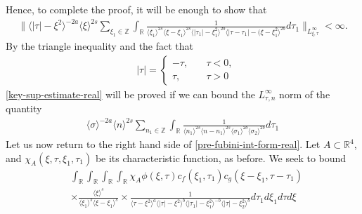 \documentclass[12pt,reqno]{amsart}
\numberwithin{equation}{section}  %
\numberwithin{figure}{section}
\newcommand{\rr}{\mathbb{R}}
\newcommand{\zz}{\mathbb{Z}}
\theoremstyle{plain}
\theoremstyle{definition}
\theoremstyle{remark}
\begin{document}
%
%
Hence, to complete the proof, it will be enough
to show that 
%
%
%
%
\begin{equation}
  \label{key-sup-estimate-real-1}
	\begin{split}
		 \| \langle | \tau | - \xi^{2} \rangle ^{-2a} \langle \xi
    \rangle ^{2s}
\sum_{\xi_{1} \in \zz} \int_{\rr} \frac{1}{  \langle \xi_{1} \rangle ^{2s} \langle
\xi-\xi_{1} \rangle ^{2s} \langle | \tau_{1}|-\xi_{1}^{2} \rangle^{2b}  \langle  |\tau -
    \tau_{1} | -(\xi - \xi_{1}^{2}
    \rangle ^{2b} } d \tau_1 \|_{L^\infty_{\xi, \tau}} < \infty.
	\end{split}
\end{equation}
%
%
By the triangle inequality and the fact that 
%
%
\begin{equation*}
\begin{split}
& | \tau | =
\begin{cases}
  - \tau, \quad & \tau < 0, 
\\
\tau, \quad & \tau > 0
\end{cases}
\end{split}
\end{equation*}
%
%
\eqref{key-sup-estimate-real} will be proved if we can bound the
$L^{\infty}_{\tau, n}$ norm of the quantity
%
%
\begin{equation}
  \label{sup-est-gen-real}
\begin{split}
		  \langle \sigma \rangle ^{-2a} \langle n
    \rangle ^{2s}
\sum_{n_{1} \in \zz} \int_{\rr} \frac{1}{ \langle n_{1} \rangle ^{2s} \langle n-n_{1} \rangle ^{2s} 
\langle \sigma_{1} \rangle^{2b} \langle  \sigma_{2} \rangle^{2b} }
d \tau_1 
	\end{split}
\end{equation}
Let us now return to the right hand side of \eqref{pre-fubini-int-form-real}.
Let $A \subset \rr^{4}$, and $\chi_{A}(\xi, \tau, \xi_{1}, \tau_{1})$ be its
characteristic function, as before.  We seek to bound
\begin{equation*}
\begin{split}
  & \int_{\rr} \int_{\rr}     \int_{\rr}  \int_{\rr} \chi_{A} \phi(\xi, \tau)
    c_f(\xi_1, \tau_1)
		c_g(\xi - \xi_1, \tau - \tau_1 )
		\\
    & \times \frac{\langle \xi \rangle ^{s}}{\langle \xi_{1} \rangle ^{s} \langle
    \xi-\xi_{1} \rangle ^{s}} \times \frac{1}{ \langle \tau - \xi^{2} \rangle^{a}
\langle |\tau| - \xi^{2} \rangle
    ^{b}\langle |\tau_{1}|-\xi_{1}^{2} \rangle ^{-b}\langle | \tau|-\xi_{2}^{2}
    \rangle ^{b}} d \tau_1 d \xi_{1} d \tau d \xi
\end{split}
\end{equation*}
\end{document}
